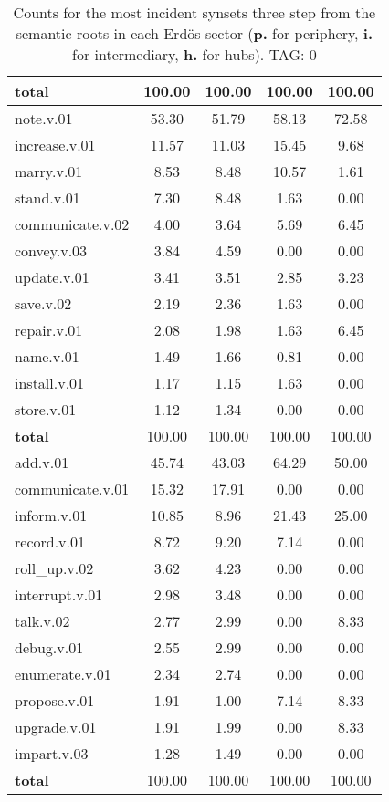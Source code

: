 \begin{table}[h!]
\begin{center}
\begin{tabular}{| l || c | c | c | c |}
{{\bf total}} & 100.00  & 100.00  & 100.00  & 100.00 \\\hline\hline\hline
note.v.01 & 53.30  & 51.79  & 58.13  & 72.58 \\\hline
increase.v.01 & 11.57  & 11.03  & 15.45  & 9.68 \\\hline
marry.v.01 & 8.53  & 8.48  & 10.57  & 1.61 \\\hline
stand.v.01 & 7.30  & 8.48  & 1.63  & 0.00 \\\hline
communicate.v.02 & 4.00  & 3.64  & 5.69  & 6.45 \\\hline
convey.v.03 & 3.84  & 4.59  & 0.00  & 0.00 \\\hline
update.v.01 & 3.41  & 3.51  & 2.85  & 3.23 \\\hline
save.v.02 & 2.19  & 2.36  & 1.63  & 0.00 \\\hline
repair.v.01 & 2.08  & 1.98  & 1.63  & 6.45 \\\hline
name.v.01 & 1.49  & 1.66  & 0.81  & 0.00 \\\hline
install.v.01 & 1.17  & 1.15  & 1.63  & 0.00 \\\hline
store.v.01 & 1.12  & 1.34  & 0.00  & 0.00 \\\hline\hline
{{\bf total}} & 100.00  & 100.00  & 100.00  & 100.00 \\\hline\hline\hline
add.v.01 & 45.74  & 43.03  & 64.29  & 50.00 \\\hline
communicate.v.01 & 15.32  & 17.91  & 0.00  & 0.00 \\\hline
inform.v.01 & 10.85  & 8.96  & 21.43  & 25.00 \\\hline
record.v.01 & 8.72  & 9.20  & 7.14  & 0.00 \\\hline
roll\_up.v.02 & 3.62  & 4.23  & 0.00  & 0.00 \\\hline
interrupt.v.01 & 2.98  & 3.48  & 0.00  & 0.00 \\\hline
talk.v.02 & 2.77  & 2.99  & 0.00  & 8.33 \\\hline
debug.v.01 & 2.55  & 2.99  & 0.00  & 0.00 \\\hline
enumerate.v.01 & 2.34  & 2.74  & 0.00  & 0.00 \\\hline
propose.v.01 & 1.91  & 1.00  & 7.14  & 8.33 \\\hline
upgrade.v.01 & 1.91  & 1.99  & 0.00  & 8.33 \\\hline
impart.v.03 & 1.28  & 1.49  & 0.00  & 0.00 \\\hline\hline
{{\bf total}} & 100.00  & 100.00  & 100.00  & 100.00 \\\hline
\end{tabular}
\caption{Counts for the most incident synsets three step from the semantic roots in each Erd\"os sector ({\bf p.} for periphery, {\bf i.} for intermediary, {\bf h.} for hubs). TAG: 0}
\end{center}
\end{table}